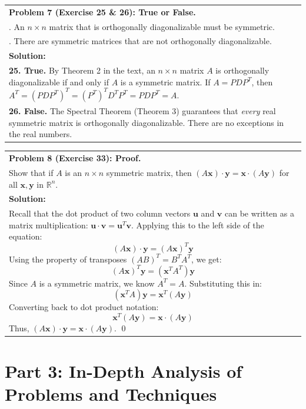 \documentclass[11pt, letterpaper]{article}
\theoremstyle{definition}
\theoremstyle{remark}
\newcommand{\R}{\mathbb{R}}
\begin{document}
\begin{tabularx}{\textwidth}{>{\raggedright\arraybackslash}X}
\toprule
\textbf{Problem 7 (Exercise 25 \& 26): True or False.} \\
25. An $n \times n$ matrix that is orthogonally diagonalizable must be symmetric. \\
26. There are symmetric matrices that are not orthogonally diagonalizable. \\
\midrule
\textbf{Solution:} \\
\textbf{25. True.} By Theorem 2 in the text, an $n \times n$ matrix $A$ is orthogonally diagonalizable if and only if $A$ is a symmetric matrix. If $A = PDP^T$, then $A^T = (PDP^T)^T = (P^T)^T D^T P^T = PDP^T = A$. \\
\textbf{26. False.} The Spectral Theorem (Theorem 3) guarantees that \textit{every} real symmetric matrix is orthogonally diagonalizable. There are no exceptions in the real numbers. \\
\bottomrule
\end{tabularx}
\vspace{1em}

\begin{tabularx}{\textwidth}{>{\raggedright\arraybackslash}X}
\toprule
\textbf{Problem 8 (Exercise 33): Proof.} \\
Show that if $A$ is an $n \times n$ symmetric matrix, then $(A\mathbf{x}) \cdot \mathbf{y} = \mathbf{x} \cdot (A\mathbf{y})$ for all $\mathbf{x}, \mathbf{y}$ in $\R^n$. \\
\midrule
\textbf{Solution:} \\
Recall that the dot product of two column vectors $\mathbf{u}$ and $\mathbf{v}$ can be written as a matrix multiplication: $\mathbf{u} \cdot \mathbf{v} = \mathbf{u}^T \mathbf{v}$.
Applying this to the left side of the equation:
\[ (A\mathbf{x}) \cdot \mathbf{y} = (A\mathbf{x})^T \mathbf{y} \]
Using the property of transposes $(AB)^T = B^T A^T$, we get:
\[ (A\mathbf{x})^T \mathbf{y} = (\mathbf{x}^T A^T) \mathbf{y} \]
Since $A$ is a symmetric matrix, we know $A^T = A$. Substituting this in:
\[ (\mathbf{x}^T A) \mathbf{y} = \mathbf{x}^T (A\mathbf{y}) \]
Converting back to dot product notation:
\[ \mathbf{x}^T (A\mathbf{y}) = \mathbf{x} \cdot (A\mathbf{y}) \]
Thus, $(A\mathbf{x}) \cdot \mathbf{y} = \mathbf{x} \cdot (A\mathbf{y})$. \qed \\
\bottomrule
\end{tabularx}

\newpage
\section{Part 3: In-Depth Analysis of Problems and Techniques}
\end{document}
